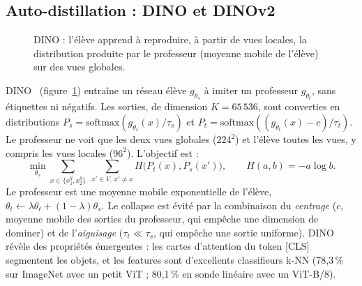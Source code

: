 \documentclass[11pt,a4paper]{article}
\begin{document}
\subsection{Auto-distillation : DINO et DINOv2}
\begin{figure}[ht]
  \centering
  \resizebox{0.85\textwidth}{!}{}
  \caption{DINO : l'élève apprend à reproduire, à partir de vues locales, la distribution produite par le professeur (moyenne mobile de l'élève) sur des vues globales.}
  \label{fig:dino}
\end{figure}

DINO~\citep{caron2021dino} (figure~\ref{fig:dino}) entraîne un réseau élève $g_{\theta_s}$ à imiter un professeur $g_{\theta_t}$, sans étiquettes ni négatifs. Les sorties, de dimension $K=65\,536$, sont converties en distributions $P_s=\mathrm{softmax}(g_{\theta_s}(x)/\tau_s)$ et $P_t=\mathrm{softmax}((g_{\theta_t}(x)-c)/\tau_t)$. Le professeur ne voit que les deux vues globales ($224^2$) et l'élève toutes les vues, y compris les vues locales ($96^2$). L'objectif est :
\begin{equation}
  \min_{\theta_s}\sum_{x\in\{x_1^g,x_2^g\}}\ \sum_{x'\in V,\,x'\neq x} H\big(P_t(x),P_s(x')\big),\qquad H(a,b)=-a\log b .
\end{equation}
Le professeur est une moyenne mobile exponentielle de l'élève, $\theta_t\leftarrow\lambda\theta_t+(1-\lambda)\theta_s$. Le collapse est évité par la combinaison du \emph{centrage} ($c$, moyenne mobile des sorties du professeur, qui empêche une dimension de dominer) et de l'\emph{aiguisage} ($\tau_t\ll\tau_s$, qui empêche une sortie uniforme). DINO révèle des propriétés émergentes : les cartes d'attention du token [CLS] segmentent les objets, et les features sont d'excellents classifieurs k-NN (78,3\,\% sur ImageNet avec un petit ViT ; 80,1\,\% en sonde linéaire avec un ViT-B/8).
\end{document}
